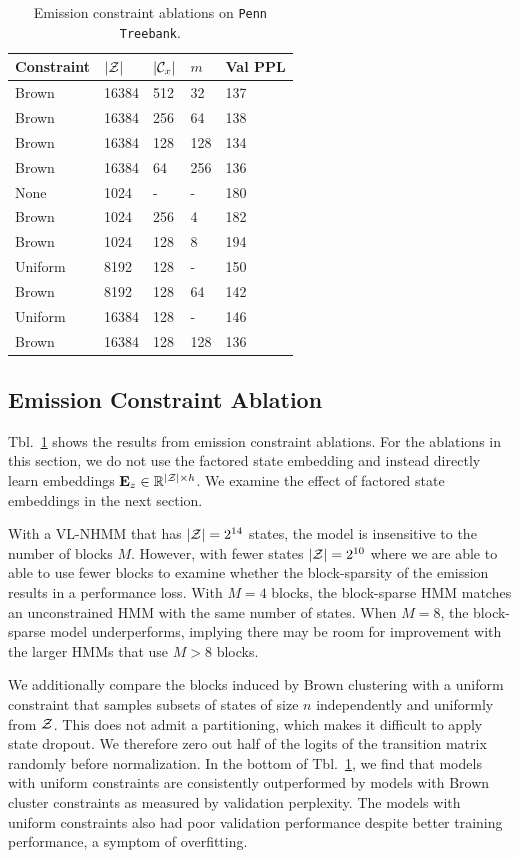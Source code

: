 \documentclass[11pt,a4paper]{article}
\begin{document}
\begin{table}[t]
\centering
\begin{tabular}{lllll}
\toprule
Constraint & $|\mathcal{Z}|$ & $|\mathcal{C}_x|$ & $m$ & Val PPL\\
\midrule
Brown & 16384 & 512 & 32  & 137\\
Brown & 16384 & 256 & 64  & 138\\
Brown & 16384 & 128 & 128 & 134\\
Brown & 16384 & 64  & 256 & 136\\
\midrule
None  & 1024 & - & - & 180\\
Brown & 1024 & 256 & 4 & 182\\
Brown & 1024 & 128 & 8 & 194\\
\midrule
Uniform    & 8192    & 128    & -   & 150\\
Brown      & 8192    & 128    & 64  & 142\\
Uniform    & 16384   & 128    & -   & 146\\
Brown      & 16384   & 128    & 128 & 136\\
\bottomrule
\end{tabular}
\caption{\label{tbl:constraint-ablation}
Emission constraint ablations on \texttt{Penn Treebank}.
}
\end{table}


\subsection{Emission Constraint Ablation}
Tbl.~\ref{tbl:constraint-ablation} shows the results from 
emission constraint ablations.
For the ablations in this section,
we do not use the factored state embedding
and instead directly learn embeddings $\mathbf{E}_z\in\mathbb{R}^{|\mathcal{Z}|\times h}$.
We examine the effect of factored state embeddings in the next section.

With a VL-NHMM that has $|\mathcal{Z}|=2^{14}$ states,
the model is insensitive to the number of blocks $M$.
However, with fewer states $|\mathcal{Z}|=2^{10}$ where we are able to
able to use fewer blocks to examine whether the block-sparsity
of the emission results in a performance loss.
With $M=4$ blocks, the block-sparse HMM matches an unconstrained HMM
with the same number of states.
When $M=8$, the block-sparse model underperforms,
implying there may be room for improvement with the larger
HMMs that use $M > 8$ blocks.

We additionally compare the blocks induced by Brown clustering with a uniform
constraint that samples subsets of states of size $n$
independently and uniformly from $\mathcal{Z}$.
This does not admit a partitioning, which makes it difficult to apply state dropout.
We therefore zero out half of the logits of the transition matrix randomly
before normalization.
In the bottom of Tbl.~\ref{tbl:constraint-ablation},
we find that models with uniform constraints
are consistently outperformed by models with Brown cluster constraints
as measured by validation perplexity.
The models with uniform constraints also had poor validation performance
despite better training performance, a symptom of overfitting.
\end{document}
